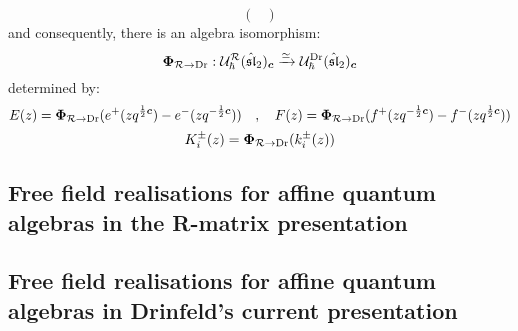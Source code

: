 \begin{remark}
\begin{equation}
\begin{pmatrix}
                    \end{pmatrix}
                \end{equation}
            and consequently, there is an algebra isomorphism:
            \begin{equation} \label{equation: ding_frenkel_isomorphism_quantum_affine_sl_2}
                \boldsymbol{\Phi}_{\mathcal{R} \to \mathrm{Dr}}: \mathcal{U}_{\hbar}^{\mathcal{R}}(\hat{\mathfrak{sl}}_2)_{\boldsymbol{c}} \xrightarrow[]{\simeq} \mathcal{U}_{\hbar}^{\mathrm{Dr}}(\hat{\mathfrak{sl}}_2)_{\boldsymbol{c}}
            \end{equation}
            determined by:
                \begin{equation}
                    E(z) = \boldsymbol{\Phi}_{\mathcal{R} \to \mathrm{Dr}}( e^+(z q^{\frac12 \boldsymbol{c}}) - e^-(z q^{-\frac12 \boldsymbol{c}}) ) \quad, \quad F(z) = \boldsymbol{\Phi}_{\mathcal{R} \to \mathrm{Dr}}( f^+(z q^{-\frac12 \boldsymbol{c}}) - f^-(z q^{\frac12 \boldsymbol{c}}) )
                \end{equation}
                \begin{equation}
                    K_i^{\pm}(z) = \boldsymbol{\Phi}_{\mathcal{R} \to \mathrm{Dr}}( k_i^{\pm}(z) )
                \end{equation}
        \end{remark}

    \subsection{Free field realisations for affine quantum algebras in the R-matrix presentation}

    \subsection{Free field realisations for affine quantum algebras in Drinfeld's current presentation}